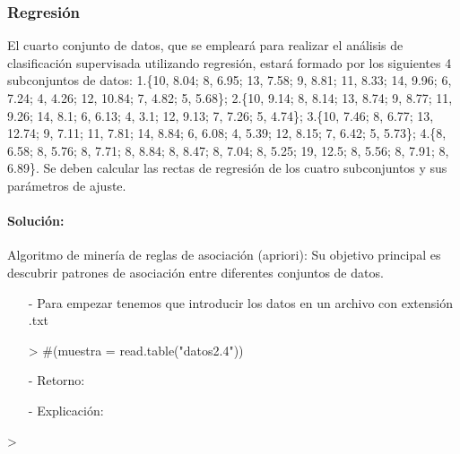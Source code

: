 \documentclass[a4paper, 12pt]{article}
\begin{document}
	\subsubsection{Regresión}
	
	El cuarto conjunto de datos, que se empleará para realizar el análisis de clasificación supervisada utilizando regresión, estará formado por los siguientes 4 subconjuntos de datos: 1.\{10, 8.04; 8, 6.95; 13, 7.58; 9, 8.81; 11, 8.33; 14, 9.96; 6, 7.24; 4, 4.26; 12, 10.84; 7, 4.82; 5, 5.68\}; 2.\{10, 9.14; 8, 8.14; 13, 8.74; 9, 8.77; 11, 9.26; 14, 8.1; 6, 6.13; 4, 3.1; 12, 9.13; 7, 7.26; 5, 4.74\}; 3.\{10, 7.46; 8, 6.77; 13, 12.74; 9, 7.11; 11, 7.81; 14, 8.84; 6, 6.08; 4, 5.39; 12, 8.15; 7, 6.42; 5, 5.73\}; 4.\{8, 6.58; 8, 5.76; 8, 7.71; 8, 8.84; 8, 8.47; 8, 7.04; 8, 5.25; 19, 12.5; 8, 5.56; 8, 7.91; 8, 6.89\}. Se deben calcular las rectas de regresión de los cuatro subconjuntos y sus parámetros de ajuste.
		
	\paragraph{Solución:}
			Algoritmo de minería de reglas de asociación (apriori): Su objetivo principal es descubrir patrones de asociación entre diferentes conjuntos de datos.
			\begin{itemize}
				\item[-] Para empezar tenemos que introducir los datos en un archivo con extensión .txt 
\begin{Schunk}
\begin{Sinput}
> #(muestra = read.table("datos2.4"))
\end{Sinput}
\end{Schunk}
				
				\item[-] Retorno: 
				
				\item[-] Explicación: 

			\end{itemize}
\begin{Schunk}
\begin{Sinput}
> 
\end{Sinput}
\end{Schunk}

  
\end{document}
